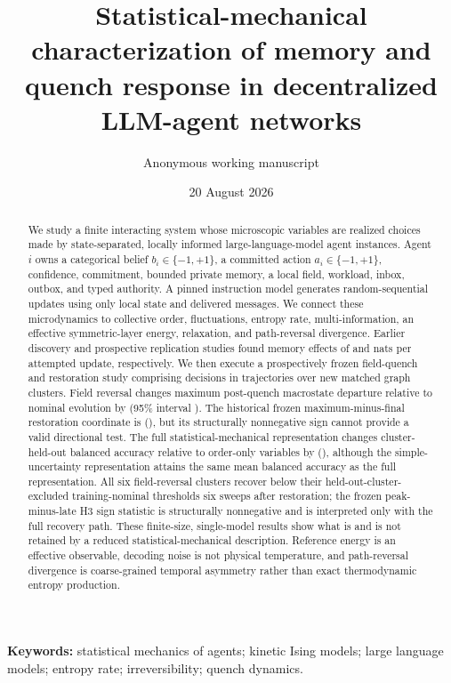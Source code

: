 \documentclass[12pt]{article}
\title{Statistical-mechanical characterization of memory and quench response in decentralized LLM-agent networks}
\author{Anonymous working manuscript}
\date{20 August 2026}
\begin{document}
\maketitle

\begin{abstract}
We study a finite interacting system whose microscopic variables are realized
choices made by state-separated, locally informed large-language-model agent
instances. Agent $i$ owns a
categorical belief $b_i\in\{-1,+1\}$, a committed action
$a_i\in\{-1,+1\}$, confidence, commitment, bounded private memory, a local
field, workload, inbox, outbox, and typed authority. A pinned instruction
model generates random-sequential updates using only local state and delivered
messages. We connect these microdynamics to collective order, fluctuations,
entropy rate, multi-information, an effective symmetric-layer energy,
relaxation, and path-reversal divergence. Earlier discovery and prospective
replication studies found memory effects of \VTwelveMemory{} and
\VThirteenMemory{} nats per attempted update, respectively. We then execute a
prospectively frozen field-quench and restoration study comprising
\VFourteenDecisions{} decisions in \VFourteenTrajectories{} trajectories over
\VFourteenClusters{} new matched graph clusters. Field reversal changes maximum
post-quench macrostate departure relative to nominal evolution by
\VFourteenHtwo{} (95\% interval \VFourteenHtwoCI). The historical frozen
maximum-minus-final restoration coordinate is \VFourteenHthree{}
(\VFourteenHthreeCI), but its structurally nonnegative sign cannot provide a
valid directional test. The full
statistical-mechanical representation changes cluster-held-out balanced
accuracy relative to order-only variables by \VFourteenHfour{}
(\VFourteenHfourCI), although the simple-uncertainty representation attains the
same mean balanced accuracy as the full representation. All six field-reversal
clusters recover below their held-out-cluster-excluded training-nominal thresholds six sweeps after
restoration; the frozen peak-minus-late H3 sign statistic is structurally
nonnegative and is interpreted only with the full recovery path. These
finite-size, single-model results show what is and is not retained by a reduced
statistical-mechanical description. Reference energy is an effective
observable, decoding noise is not physical temperature, and path-reversal
divergence is coarse-grained temporal asymmetry rather than exact thermodynamic
entropy production.
\end{abstract}

\noindent\textbf{Keywords:} statistical mechanics of agents; kinetic Ising
models; large language models; entropy rate; irreversibility; quench dynamics.
\end{document}
